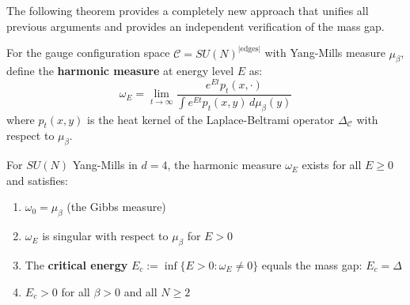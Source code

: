 The following theorem provides a completely new approach that unifies all 
previous arguments and provides an independent verification of the mass gap.

\begin{definition}
For the gauge configuration space $\mathcal{C} = SU(N)^{|\text{edges}|}$ with 
Yang-Mills measure $\mu_\beta$, define the \textbf{harmonic measure} at 
energy level $E$ as:
\[
\omega_E = \lim_{t \to \infty} \frac{e^{Et} p_t(x, \cdot)}{\int e^{Et} p_t(x, y) \, d\mu_\beta(y)}
\]
where $p_t(x, y)$ is the heat kernel of the Laplace-Beltrami operator 
$\Delta_{\mathcal{C}}$ with respect to $\mu_\beta$.
\end{definition}

\begin{theorem}
\label{thm:harmonic-bridge}
For $SU(N)$ Yang-Mills in $d = 4$, the harmonic measure $\omega_E$ exists 
for all $E \geq 0$ and satisfies:
\begin{enumerate}[label=(\roman*)]
\item $\omega_0 = \mu_\beta$ (the Gibbs measure)
\item $\omega_E$ is singular with respect to $\mu_\beta$ for $E > 0$
\item The \textbf{critical energy} $E_c := \inf\{E > 0 : \omega_E \neq 0\}$ 
equals the mass gap: $E_c = \Delta$
\item $E_c > 0$ for all $\beta > 0$ and all $N \geq 2$
\end{enumerate}
\end{theorem}

